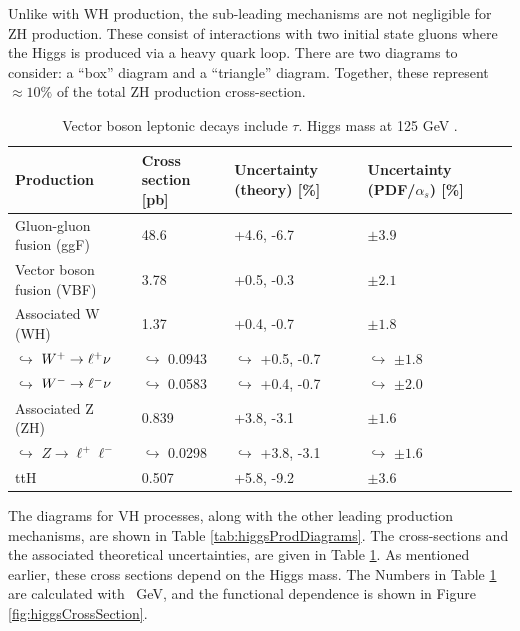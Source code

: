 Unlike with WH production, the sub-leading mechanisms are not negligible for ZH production.
These consist of interactions with two initial state gluons where the Higgs is produced via a heavy quark loop.
There are two diagrams to consider: a ``box'' diagram and a ``triangle'' diagram.
Together, these represent $\approx10\%$ of the total ZH production cross-section.

\begin{table}[htp]
\caption{Vector boson leptonic decays include $\tau$. Higgs mass at 125 GeV \cite{higgsCross}.}
\begin{center}
{\footnotesize
\begin{tabular}{l | l | l l l}
\toprule
Production & Cross section [pb] & Uncertainty (theory) [\%] & Uncertainty (PDF/$\alpha_s$) [\%] \\
\midrule
Gluon-gluon fusion (ggF)  & 48.6        & +4.6, -6.7 & $\pm3.9$  \\
Vector boson fusion (VBF) &  3.78       & +0.5, -0.3 & $\pm2.1$  \\
Associated W (WH)         & 1.37        & +0.4, -0.7 & $\pm1.8$  \\
$\hookrightarrow$  $W^+\to\ell^+\nu$    &$\hookrightarrow$ 0.0943 &$\hookrightarrow$ +0.5, -0.7 &$\hookrightarrow$ $\pm1.8$  \\
$\hookrightarrow$  $W^-\to\ell^-\nu$    &$\hookrightarrow$ 0.0583  &$\hookrightarrow$ +0.4, -0.7 &$\hookrightarrow$ $\pm2.0$  \\
Associated Z (ZH)         & 0.839       & +3.8, -3.1 & $\pm1.6$  \\
$\hookrightarrow$  $Z\to\ell^+\ell^-$   &$\hookrightarrow$ 0.0298 &$\hookrightarrow$ +3.8, -3.1 &$\hookrightarrow$ $\pm1.6$  \\
ttH                       &  0.507      & +5.8, -9.2 & $\pm3.6$  \\
\bottomrule
\end{tabular}
}
\label{tab:higgsCrossSec}
\end{center}
\end{table}

The diagrams for VH processes, along with the other leading production mechanisms, are shown in Table \ref{tab:higgsProdDiagrams}.
The cross-sections and the associated theoretical uncertainties, are given in Table \ref{tab:higgsCrossSec}.
As mentioned earlier, these cross sections depend on the Higgs mass. The Numbers in Table \ref{tab:higgsCrossSec} are calculated with ~GeV, and the functional dependence is shown in Figure \ref{fig:higgsCrossSection}.

